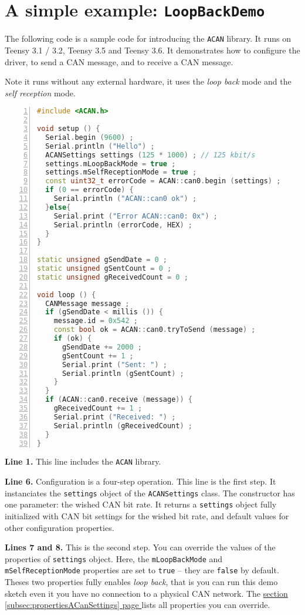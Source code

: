 \documentclass[9pt, a4paper, obeyspaces, openany]{extarticle}
\newcommand\refSubsectionPage[1]{\hyperref[subsec:#1]{section \ref*{subsec:#1} page \pageref{subsec:#1}}}
\begin{document}
\section{A simple example: \texttt{LoopBackDemo}}

The following code is a sample code for introducing the \texttt{ACAN} library. It runs on Teensy 3.1 / 3.2, Teensy 3.5 and Teensy 3.6. It demonstrates how to configure the driver, to send a CAN message, and to receive a CAN message.

Note it runs without any external hardware, it uses the \emph{loop back} mode and the \emph{self reception} mode.

{ \small\begin{lstlisting}[language=c++,numbers=left]
#include <ACAN.h>

void setup () {
  Serial.begin (9600) ;
  Serial.println ("Hello") ;
  ACANSettings settings (125 * 1000) ; // 125 kbit/s
  settings.mLoopBackMode = true ;
  settings.mSelfReceptionMode = true ;
  const uint32_t errorCode = ACAN::can0.begin (settings) ;
  if (0 == errorCode) {
    Serial.println ("ACAN::can0 ok") ;
  }else{
    Serial.print ("Error ACAN::can0: 0x") ;
    Serial.println (errorCode, HEX) ;
  }
}

static unsigned gSendDate = 0 ;
static unsigned gSentCount = 0 ;
static unsigned gReceivedCount = 0 ;

void loop () {
  CANMessage message ;
  if (gSendDate < millis ()) {
    message.id = 0x542 ;
    const bool ok = ACAN::can0.tryToSend (message) ;
    if (ok) {
      gSendDate += 2000 ;
      gSentCount += 1 ;
      Serial.print ("Sent: ") ;
      Serial.println (gSentCount) ;
    }
  }
  if (ACAN::can0.receive (message)) {
    gReceivedCount += 1 ;
    Serial.print ("Received: ") ;
    Serial.println (gReceivedCount) ;
  }
}
\end{lstlisting}}

{\bf Line 1.} This line includes the \texttt{ACAN} library.

{\bf Line 6.} Configuration is a four-step operation. This line is the first step. It instanciates the \texttt{settings} object of the \texttt{ACANSettings} class. The constructor has one parameter: the wished CAN bit rate. It returns a \texttt{settings} object fully initialized with CAN bit settings for the wished bit rate, and default values for other configuration properties.

{\bf Lines 7 and 8.} This is the second step. You can override the values of the properties of \texttt{settings} object. Here, the \texttt{mLoopBackMode} and \texttt{mSelfReceptionMode} properties are set to \texttt{true} -- they are \texttt{false} by default. Theses two properties fully enables \emph{loop back}, that is you can run this demo sketch even it you have no connection to a physical CAN network. The \refSubsectionPage{propertiesACanSettings} lists all properties you can override.
\end{document}
